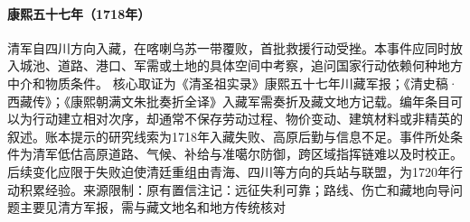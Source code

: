 \hypertarget{civic:EQ-1718-QING-TIBET-EXPEDITION}{}\paragraph{康熙五十七年（1718年）}清军自四川方向入藏，在喀喇乌苏一带覆败，首批救援行动受挫。本事件应同时放入城池、道路、港口、军需或土地的具体空间中考察，追问国家行动依赖何种地方中介和物质条件。 核心取证为《清圣祖实录》康熙五十七年川藏军报；《清史稿·西藏传》；《康熙朝满文朱批奏折全译》入藏军需奏折及藏文地方记载。编年条目可以为行动建立相对次序，却通常不保存劳动过程、物价变动、建筑材料或非精英的叙述。账本提示的研究线索为1718年入藏失败、高原后勤与信息不足。事件所处条件为清军低估高原道路、气候、补给与准噶尔防御，跨区域指挥链难以及时校正。后续变化应限于失败迫使清廷重组由青海、四川等方向的兵站与联盟，为1720年行动积累经验。来源限制：原有置信注记：远征失利可靠；路线、伤亡和藏地向导问题主要见清方军报，需与藏文地名和地方传统核对
